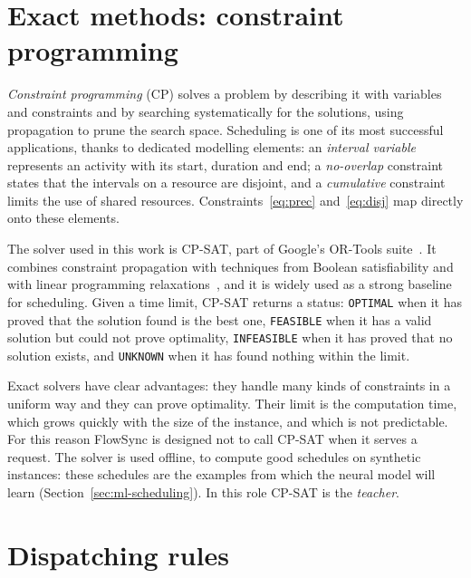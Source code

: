 \section{Exact methods: constraint programming}
\label{sec:cpsat}

\emph{Constraint programming} (CP) solves a problem by describing it with variables and
constraints and by searching systematically for the solutions, using propagation to prune the
search space. Scheduling is one of its most successful applications, thanks to dedicated
modelling elements: an \emph{interval variable} represents an activity with its start, duration
and end; a \emph{no-overlap} constraint states that the intervals on a resource are disjoint, and
a \emph{cumulative} constraint limits the use of shared resources. Constraints~\eqref{eq:prec}
and~\eqref{eq:disj} map directly onto these elements.

The solver used in this work is CP-SAT, part of Google's OR-Tools suite~\cite{ortools}. It
combines constraint propagation with techniques from Boolean satisfiability and with linear
programming relaxations~\cite{perron2023cpsat}, and it is widely used as a strong baseline for
scheduling. Given a time limit, CP-SAT returns a status:
\texttt{OPTIMAL} when it has proved that the solution found is the best one,
\texttt{FEASIBLE} when it has a valid solution but could not prove optimality,
\texttt{INFEASIBLE} when it has proved that no solution exists, and \texttt{UNKNOWN} when it has
found nothing within the limit.

Exact solvers have clear advantages: they handle many kinds of constraints in a uniform way and
they can prove optimality. Their limit is the computation time, which grows quickly with the
size of the instance, and which is not predictable. For this reason FlowSync is designed not to
call CP-SAT when it serves a request. The solver is used offline, to compute good schedules on
synthetic instances: these schedules are the examples from which the neural model will learn
(Section~\ref{sec:ml-scheduling}). In this role CP-SAT is the \emph{teacher}.

\section{Dispatching rules}
\label{sec:dispatching}

